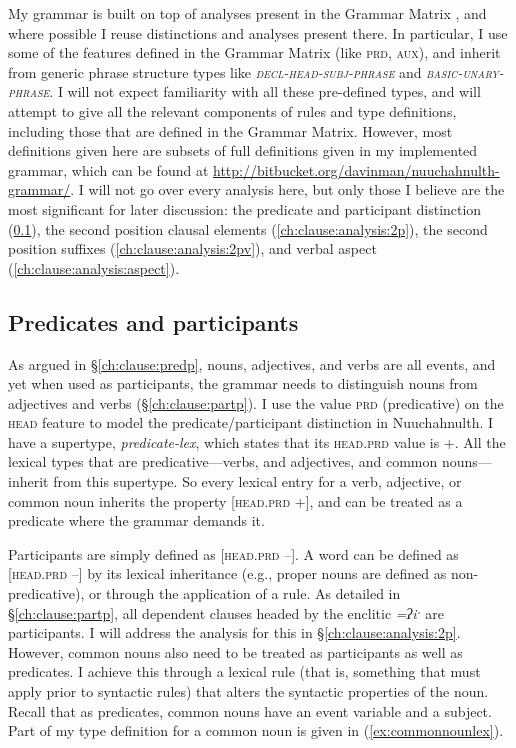 My grammar is built on top of analyses present in the Grammar Matrix \citep{bender2002}, and where possible I reuse distinctions and analyses present there. In particular, I use some of the features defined in the Grammar Matrix (like \textsc{prd}, \textsc{aux}), and inherit from generic phrase structure types like \textit{\textsc{decl-head-subj-phrase}} and \textit{\textsc{basic-unary-phrase}}. I will not expect familiarity with all these pre-defined types, and will attempt to give all the relevant components of rules and type definitions, including those that are defined in the Grammar Matrix. However, most definitions given here are subsets of full definitions given in my implemented grammar, which can be found at \url{http://bitbucket.org/davinman/nuuchahnulth-grammar/}. I will not go over every analysis here, but only those I believe are the most significant for later discussion: the predicate and participant distinction (\ref{ch:clause:analysis:predpart}), the second position clausal elements (\ref{ch:clause:analysis:2p}), the second position suffixes (\ref{ch:clause:analysis:2pv}), and verbal aspect (\ref{ch:clause:analysis:aspect}).

\subsection{Predicates and participants} \label{ch:clause:analysis:predpart}

As argued in \S\ref{ch:clause:predp}, nouns, adjectives, and verbs are all events, and yet when used as participants, the grammar needs to distinguish nouns from adjectives and verbs (\S\ref{ch:clause:partp}). I use the value \textsc{prd} (predicative) on the \textsc{head} feature to model the predicate/participant distinction in Nuuchahnulth. I have a supertype, \textit{predicate-lex}, which states that its \textsc{head.prd} value is +. All the lexical types that are predicative---verbs, and adjectives, and common nouns---inherit from this supertype. So every lexical entry for a verb, adjective, or common noun inherits the property [\textsc{head.prd} +], and can be treated as a predicate where the grammar demands it.

Participants are simply defined as [\textsc{head.prd} --]. A word can be defined as [\textsc{head.prd} --] by its lexical inheritance (e.g., proper nouns are defined as non-predicative), or through the application of a rule. As detailed in \S\ref{ch:clause:partp}, all dependent clauses headed by the enclitic \textit{=ʔiˑ} are participants. I will address the analysis for this in \S\ref{ch:clause:analysis:2p}. However, common nouns also need to be treated as participants as well as predicates. I achieve this through a lexical rule (that is, something that must apply prior to syntactic rules) that alters the syntactic properties of the noun. Recall that as predicates, common nouns have an event variable and a subject. Part of my type definition for a common noun is given in (\ref{ex:commonnounlex}).

